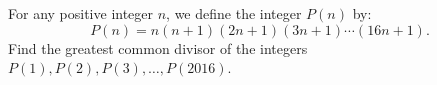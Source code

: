 \documentclass[varwidth]{standalone}
\begin{document}
    For any positive integer $n$, we define the integer $P(n)$ by:
    \[
        P(n) = n(n + 1)(2n + 1)(3n + 1) \dotsb (16n + 1).  
    \]
    Find the greatest common divisor of the integers $P(1), P(2), P(3), \dots, P(2016)$.
\end{document}
